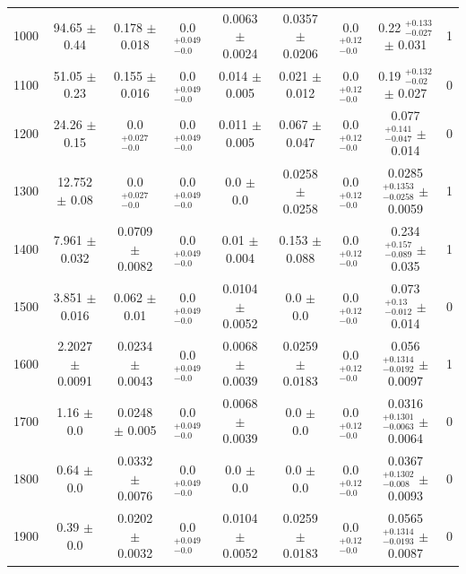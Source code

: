 \begin{table}[H]
\begin{center}
\begin{tabular}{ccccccccc}
            1000  &     94.65 $\pm$ 0.44  &   	 0.178 $\pm$ 0.018  &           0.0 $ _{-0.0}^{+0.049}$  &  0.0063 $\pm$ 0.0024  &	 0.0357 $\pm$ 0.0206  &     0.0 $ _{-0.0}^{+0.12}$   &  0.22 $ _{-0.027}^{+0.133}$   $\pm$ 0.031  &         1 \\
            1100  &     51.05 $\pm$ 0.23  &   	 0.155 $\pm$ 0.016  &           0.0 $ _{-0.0}^{+0.049}$  &  0.014 $\pm$ 0.005  &  	 0.021 $\pm$ 0.012  &       0.0 $ _{-0.0}^{+0.12}$   &  0.19 $ _{-0.02}^{+0.132}$   $\pm$ 0.027  &          0 \\
            1200  &     24.26 $\pm$ 0.15  &   	 0.0 $ _{-0.0}^{+0.027}$   &    0.0 $ _{-0.0}^{+0.049}$  &  0.011 $\pm$ 0.005  &  	 0.067 $\pm$ 0.047  &       0.0 $ _{-0.0}^{+0.12}$   &  0.077 $ _{-0.047}^{+0.141}$   $\pm$ 0.014  &        0 \\
            1300  &     12.752 $\pm$ 0.08  &  	 0.0 $ _{-0.0}^{+0.027}$   &    0.0 $ _{-0.0}^{+0.049}$  &  0.0 $\pm$ 0.0  &      	 0.0258 $\pm$ 0.0258  &     0.0 $ _{-0.0}^{+0.12}$   &  0.0285 $ _{-0.0258}^{+0.1353}$   $\pm$ 0.0059  &    1 \\
            1400  &     7.961 $\pm$ 0.032  &  	 0.0709 $\pm$ 0.0082  &         0.0 $ _{-0.0}^{+0.049}$  &  0.01 $\pm$ 0.004  &   	 0.153 $\pm$ 0.088  &       0.0 $ _{-0.0}^{+0.12}$   &  0.234 $ _{-0.089}^{+0.157}$   $\pm$ 0.035  &        1 \\
            1500  &     3.851 $\pm$ 0.016  &  	 0.062 $\pm$ 0.01  &            0.0 $ _{-0.0}^{+0.049}$  &  0.0104 $\pm$ 0.0052  &	 0.0 $\pm$ 0.0  &           0.0 $ _{-0.0}^{+0.12}$   &  0.073 $ _{-0.012}^{+0.13}$   $\pm$ 0.014  &         0 \\
            1600  &     2.2027 $\pm$ 0.0091  &	 0.0234 $\pm$ 0.0043  &         0.0 $ _{-0.0}^{+0.049}$  &  0.0068 $\pm$ 0.0039  &	 0.0259 $\pm$ 0.0183  &     0.0 $ _{-0.0}^{+0.12}$   &  0.056 $ _{-0.0192}^{+0.1314}$   $\pm$ 0.0097  &     1 \\
            1700  &     1.16 $\pm$ 0.0  &     	 0.0248 $\pm$ 0.005  &          0.0 $ _{-0.0}^{+0.049}$  &  0.0068 $\pm$ 0.0039  &	 0.0 $\pm$ 0.0  &           0.0 $ _{-0.0}^{+0.12}$   &  0.0316 $ _{-0.0063}^{+0.1301}$   $\pm$ 0.0064  &    0 \\
            1800  &     0.64 $\pm$ 0.0  &     	 0.0332 $\pm$ 0.0076  &         0.0 $ _{-0.0}^{+0.049}$  &  0.0 $\pm$ 0.0  &      	 0.0 $\pm$ 0.0  &           0.0 $ _{-0.0}^{+0.12}$   &  0.0367 $ _{-0.008}^{+0.1302}$   $\pm$ 0.0093  &     0 \\
            1900  &     0.39 $\pm$ 0.0  &     	 0.0202 $\pm$ 0.0032  &         0.0 $ _{-0.0}^{+0.049}$  &  0.0104 $\pm$ 0.0052  &	 0.0259 $\pm$ 0.0183  &     0.0 $ _{-0.0}^{+0.12}$   &  0.0565 $ _{-0.0193}^{+0.1314}$   $\pm$ 0.0087  &    0 \\

\end{tabular}
\end{center}
\end{table}
